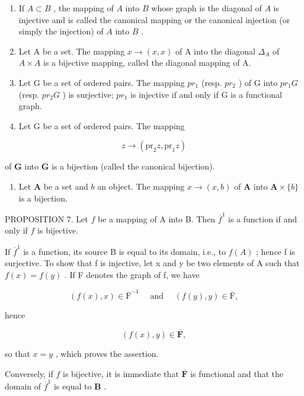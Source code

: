 \begin{enumerate}
\def\labelenumi{(\arabic{enumi})}
\item
  If \(A \subset B\) , the mapping of \(A\) into \(B\) whose graph is the diagonal of \(A\) is injective and is called the canonical mapping or the canonical injection (or simply the injection) of \(A\) into \(B\) .
\item
  Let A be a set. The mapping \(x \to (x, x)\) of A into the diagonal \(\Delta_{A}\) of \(A \times A\) is a bijective mapping, called the diagonal mapping of A.
\item
  Let G be a set of ordered pairs. The mapping \(pr_{1}\) (resp. \(pr_{2}\) ) of G into \(pr_{1}G\) (resp. \(pr_{2}G\) ) is surjective; \(pr_{1}\) is injective if and only if G is a functional graph.
\item
  Let G be a set of ordered pairs. The mapping
\end{enumerate}

\[
z \rightarrow (\mathrm{pr} _ {2} z, \mathrm{pr} _ {1} z)
\]

of \(\mathbf{G}\) into \(\overline{\mathbf{G}}\) is a bijection (called the canonical bijection).

\begin{enumerate}
\def\labelenumi{(\arabic{enumi})}
\setcounter{enumi}{4}
\tightlist
\item
  Let \(\mathbf{A}\) be a set and \(b\) an object. The mapping \(x \to (x, b)\) of \(\mathbf{A}\) into \(\mathbf{A} \times \{b\}\) is a bijection.
\end{enumerate}

PROPOSITION 7. Let \(f\) be a mapping of A into B. Then \(\overline{f}^1\) is a function if and only if \(f\) is bijective.

If \(\overline{f}^{1}\) is a function, its source B is equal to its domain, i.e., to \(f(A)\) ; hence f is surjective. To show that f is injective, let x and y be two elements of A such that \(f(x)=f(y)\) . If F denotes the graph of f, we have

\[
(f (x), x) \in \overline {{\mathrm{F}}} ^ {- 1} \quad \text { and } \quad (f (y), y) \in \overline {{\mathrm{F}}},
\]

hence

\[
(f (x), y) \in \overline {{\mathbf {F}}},
\]

so that \(x = y\) , which proves the assertion.

Conversely, if \(f\) is bijective, it is immediate that \(\overline{\mathbf{F}}\) is functional and that the domain of \(\overline{f}^1\) is equal to \(\mathbf{B}\) .

